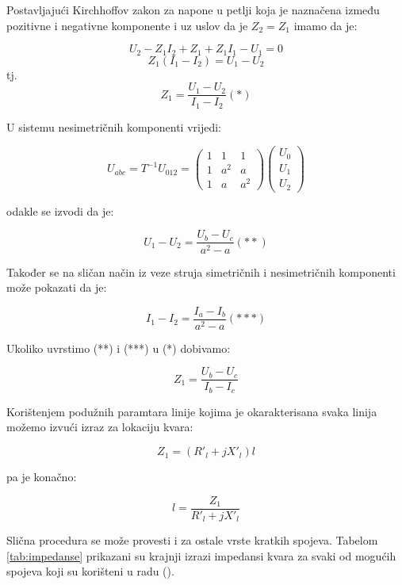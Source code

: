 Postavljajući Kirchhoffov zakon za napone u petlji koja je naznačena između pozitivne i negativne komponente i uz uslov da je $Z_2=Z_1$ imamo da je:

\[U_2-Z_1I_2+Z_1+Z_1I_1-U_1=0\]
\[Z_1(I_1-I_2)=U_1-U_2\]
tj.
\[Z_1=\frac{U_1-U_2}{I_1-I_2} (*)\]

U sistemu nesimetričnih komponenti vrijedi:

\[U_{abc}=T^{-1}U_{012}=\begin{pmatrix} 1 & 1 & 1 \\
1 & a^2 & a \\
1 & a & a^2 \end{pmatrix} \begin{pmatrix} U_0 \\
U_1 \\
U_2 \end{pmatrix} \]

odakle se izvodi da je:

\[U_1-U_2=\frac{U_b-U_c}{a^2-a} (**) \]

Također se na sličan način iz veze struja simetričnih i nesimetričnih komponenti može pokazati da je:

\[I_1-I_2=\frac{I_a-I_b}{a^2-a} (***) \]

Ukoliko uvrstimo (**) i (***) u (*) dobivamo:

\[Z_1=\frac{U_b-U_c}{I_b-I_c} \]

Korištenjem podužnih paramtara linije kojima je okarakterisana svaka linija možemo izvući izraz za lokaciju kvara:

\[Z_1=(R'_l+jX'_l)l \]

pa je konačno: 

\[ l= \frac{Z_1}{R'_l+jX'_l} \]

Slična procedura se može provesti i za ostale vrste kratkih spojeva. Tabelom \ref{tab:impedanse} prikazani su krajnji izrazi impedansi kvara za svaki od mogućih spojeva koji su korišteni u radu (\cite{cetvrta}).

